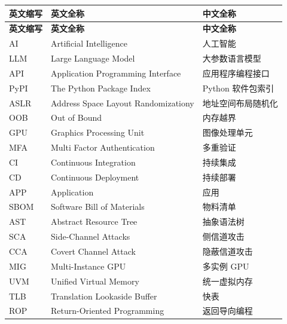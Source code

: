 \cleardoublepage
{}
\begin{center}
    \begin{longtable}{m{2cm}m{8cm}m{5cm}}
        \toprule
        \textbf{英文缩写}&\textbf{英文全称}&\textbf{中文全称}\\
        \midrule
        \endfirsthead
        \toprule
        \textbf{英文缩写}&\textbf{英文全称}&\textbf{中文全称}\\
        \midrule
        \endhead 
        \bottomrule
        \endfoot
        \bottomrule
        \endlastfoot
        AI&Artificial Intelligence&人工智能\\
        LLM&Large Language Model&大参数语言模型\\
        API&Application Programming Interface&应用程序编程接口\\
        PyPI&The Python Package Index&Python 软件包索引\\
        ASLR&Address Space Layout Randomizationy&地址空间布局随机化\\
        OOB&Out of Bound&内存越界\\
        GPU&Graphics Processing Unit&图像处理单元\\
        MFA&Multi Factor Authentication&多重验证\\
        CI&Continuous Integration&持续集成\\
        CD&Continuous Deployment&持续部署\\
        APP&Application&应用\\
        SBOM&Software Bill of Materials&物料清单\\
        AST&Abstract Resource Tree&抽象语法树\\
        SCA&Side-Channel Attacks&侧信道攻击\\
        CCA&Covert Channel Attack&隐蔽信道攻击\\
        MIG&Multi-Instance GPU&多实例 GPU\\
        UVM&Unified Virtual Memory&统一虚拟内存\\
        TLB&Translation Lookaside Buffer&快表\\
        ROP&Return-Oriented Programming&返回导向编程\\

\end{longtable}
\end{center}
